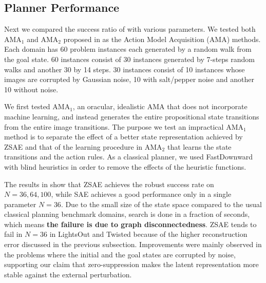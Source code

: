 \subsection{Planner Performance}

Next we compared the success ratio of \latentplanner with various parameters.
We tested both AMA$_1$ and AMA$_2$ proposed in \cite{Asai2018} as the Action Model Acquisition (AMA) methods.
% 
Each domain has 60 problem instances each generated by a random walk from
the goal state. 60 instances consist of 30 instances generated by 7-steps random walks
and another 30 by 14 steps. 30 instances consist of 10 instances whose images are corrupted by Gaussian noise,
10 with salt/pepper noise and another 10 without noise.

We first tested AMA$_1$, an oracular, idealistic AMA that does not incorporate machine learning,
and instead generates the entire propositional state transitions from the entire image transitions.
The purpose we test an impractical AMA$_1$ method is
to separate the effect of a better state representation achieved by ZSAE
and that of the learning procedure in AMA$_2$ that learns the state transitions and the action rules.
As a classical planner, we used FastDownward \cite{Helmert04} with blind heuristics in order to
remove the effects of the heuristic functions.

The results in  show that ZSAE achieves the robust success rate on $N=36,64,100$,
while SAE achieves a good performance only in a single parameter $N=36$.
% 
Due to the small size of the state space compared to the usual classical planning benchmark domains,
search is done in a fraction of seconds, which means \textbf{the failure is due to graph disconnectedness}.
ZSAE tends to fail in $N=36$ in LightsOut and Twisted because of the higher reconstruction error
discussed in the previous subsection.
% 
Improvements were mainly observed in the problems where
the initial and the goal states are corrupted by noise, supporting our claim that
zero-suppression makes the latent representation more stable against the external perturbation.

